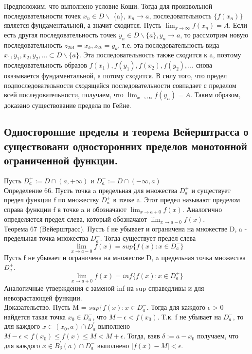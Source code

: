 \documentclass[12pt]{article}
\theoremstyle{definition}
\begin{document}
Предположим, что выполнено условие Коши. Тогда для произвольной последовательности точек $x_n \in D \backslash$ \{a\}, $x_n \to a$, последовательность $\{f(x_n)\}$ является фундаментальной, а значит сходится. Пусть $\lim_{x \to \infty} f(x_n) = A$. Если есть другая последовательность точек $y_n \in D \backslash \{a\}, y_n \to a$, то рассмотрим новую последовательность $z_{2k1} = x_k, z_{2k} = y_k$, т.е. эта последовательность вида $x_1, y_1, x_2, y_2, \dots \subset D \backslash \{a\}$. Эта последовательность также сходится к a, поэтому последовательность образов $f(x_1), f(y_1), f(x_2), f(y_2), \dots$ снова оказывается фундаментальной, а потому сходится. В силу того, что предел подпоследовательности сходящейся последовательности совпадает с пределом всей последовательности, получаем, что $\lim_{x \to \infty} f(y_n) = A$. Таким образом, доказано существование предела по Гейне.
\smallskip 
\subsection{Односторонние пределы и теорема Вейерштрасса о существовани односторонних пределов монотонной ограниченной функции.} 
Пусть $D^{+}_{a} := D \cap (a, +\infty)$ и $D^{-}_{a} := D \cap (-\infty, a)$\\
Определение 66. Пусть точка a предельная для множества $D^{+}_{a}$ и существует предел функции f по множеству $D^{+}_{a}$ в точке a. Этот предел называют пределом справа функции f в точке a и обозначают $\lim_{x \to a+0} f(x)$. Аналогично определяется предел слева, который обозначают $\lim_{x \to a-0} f(x)$. \\

Теорема 67 (Вейерштрасс). Пусть f не убывает и ограничена на множестве D, a - предельная точка множества $D^{-}_{a}$. Тогда существует предел слева
$$\lim_{x \to a-0} f(x) = sup\{f(x):x \in D^{-}_{a}\}$$
Пусть f не убывает и ограничена на множестве D, a предельная точка множества $D^{+}_{a}$. $$\lim_{x \to a+0} f(x) = inf\{f(x):x \in D^{+}_{a}\}$$
Аналогичные утверждения с заменой inf на sup справедливы и для невозрастающей
функции.\\
Доказательство. Пусть M = $sup\{f(x):x \in D^{-}_{a}$. Тогда для каждого $\epsilon$ > 0 найдется такая точка $x_0 \in D^{-}_{a}$, что $M-\epsilon < f(x_0)$. Т.к. f не убывает на $D^{-}_{a}$, то для каждого $x \in (x_0, a) \cap D^{'}_{a} $ выполнено $M - \epsilon < f(x_0) \leq f(x) \leq M < M + \epsilon$. Тогда, взяв $\delta := a - x_0$ получаем, что для каждого $x \in B^{'}_{\delta}(a) \cap D^{-}_{a}$ выполнено $|f(x) - M| < \epsilon$.
\end{document}
